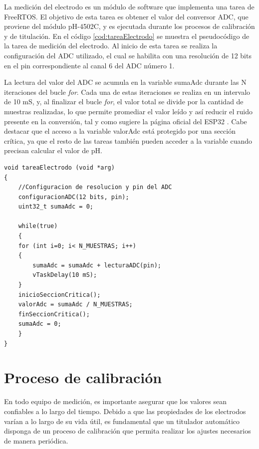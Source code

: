 La medición del electrodo es un módulo de software que implementa una tarea de FreeRTOS. El objetivo de esta tarea es obtener el valor del conversor ADC, que proviene del módulo pH-4502C, y es ejecutada durante los procesos de calibración y de titulación. En el código \ref{cod:tareaElectrodo} se muestra el pseudocódigo de la tarea de medición del electrodo. Al inicio de esta tarea se realiza la configuración del ADC utilizado, el cual se habilita con una resolución de 12 bits en el pin correspondiente al canal 6 del ADC número 1.

La lectura del valor del ADC se acumula en la variable sumaAdc durante las N iteraciones del bucle \textit{for}. Cada una de estas iteraciones se realiza en un intervalo de 10 mS, y, al finalizar el bucle \textit{for}, el valor total se divide por la cantidad de muestras realizadas, lo que permite promediar el valor leído y así reducir el ruido presente en la conversión, tal y como sugiere la página oficial del ESP32 \citep{WEBSITE:2}. Cabe destacar que el acceso a la variable valorAdc está protegido por una sección crítica, ya que el resto de las tareas también pueden acceder a la variable cuando precisan calcular el valor de pH.

\begin{lstlisting}[label=cod:tareaElectrodo,caption=Pseudocódigo de la tarea de medición de pH.]
void tareaElectrodo (void *arg)
{
    //Configuracion de resolucion y pin del ADC
    configuracionADC(12 bits, pin);
    uint32_t sumaAdc = 0;

    while(true)
    {
    for (int i=0; i< N_MUESTRAS; i++)
    {
        sumaAdc = sumaAdc + lecturaADC(pin);  
        vTaskDelay(10 mS);
    } 
    inicioSeccionCritica(); 
    valorAdc = sumaAdc / N_MUESTRAS;
    finSeccionCritica();
    sumaAdc = 0;
    }
}
\end{lstlisting}

\section{Proceso de calibración}

En todo equipo de medición, es importante asegurar que los valores sean confiables a lo largo del tiempo. Debido a que las propiedades de los electrodos varían a lo largo de su vida útil, es fundamental que un titulador automático disponga de un proceso de calibración que permita realizar los ajustes necesarios de manera periódica.

